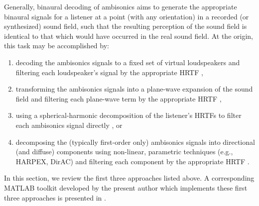 Generally, binaural decoding of ambisonics aims to generate the appropriate binaural signals for a listener at a point (with any orientation) in a recorded (or synthesized) sound field,
such that the resulting perception of the sound field is identical to that which would have occurred in the real sound field.
At the origin, this task may be accomplished by:
\begin{enumerate}
\item decoding the ambisonics signals to a fixed set of virtual loudspeakers and filtering each loudspeaker's signal by the appropriate HRTF \citep{McKeagMcGrath1996,Noisternig2003a},
\item transforming the ambisonics signals into a plane-wave expansion of the sound field and filtering each plane-wave term by the appropriate HRTF \citep{Duraiswami2005a,MenziesAlAkaidi2007b}, 
\item using a spherical-harmonic decomposition of the listener's HRTFs to filter each ambisonics signal directly \citep{RafaelyAvni2010,Bernschutz2014}, or
\item decomposing the (typically first-order only) ambisonics signals into directional (and diffuse) components using non-linear, parametric techniques (e.g., HARPEX, DirAC) and filtering each component by the appropriate HRTF \citep{Laitinen2008,BergeBarrett2010b}.
\end{enumerate}
In this section, we review the first three approaches listed above.
A corresponding MATLAB toolkit developed by the present author which implements these first three approaches is presented in .

